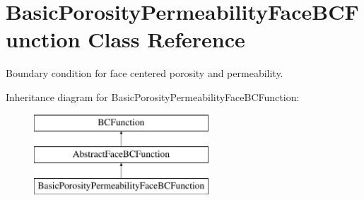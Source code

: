 \hypertarget{class_basic_porosity_permeability_face_b_c_function}{}\section{Basic\+Porosity\+Permeability\+Face\+B\+C\+Function Class Reference}
\label{class_basic_porosity_permeability_face_b_c_function}


Boundary condition for face centered porosity and permeability.  


Inheritance diagram for Basic\+Porosity\+Permeability\+Face\+B\+C\+Function\+:\begin{figure}[H]
\begin{center}
\leavevmode
\includegraphics[height=3.000000cm]{class_basic_porosity_permeability_face_b_c_function}
\end{center}
\end{figure}
